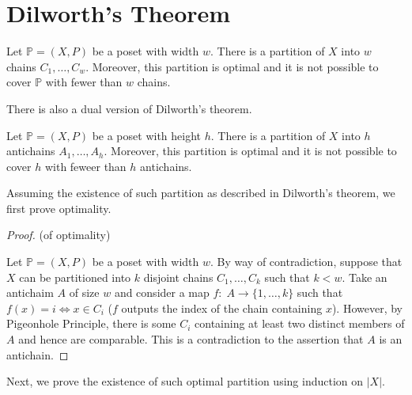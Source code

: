 \section{Dilworth's Theorem}

\begin{theorem}
    Let $\mathbb{P} = (X,P)$ be a poset with width $w$. There is a partition of $X$ into $w$ chains $C_1,\ldots,C_w$. Moreover, this partition is optimal and it is not possible to cover $\mathbb{P}$ with fewer than $w$ chains.
\end{theorem}

There is also a dual version of Dilworth's theorem.

\begin{theorem}
    Let $\mathbb{P} = (X,P)$ be a poset with height $h$. There is a partition of $X$ into $h$ antichains $A_1,\ldots,A_h$. Moreover, this partition is optimal and it is not possible to cover $h$ with feweer than $h$ antichains.
\end{theorem}

Assuming the existence of such partition as described in Dilworth's theorem, we first prove optimality.

\begin{proof} (of optimality)
    \hfill

    Let $\mathbb{P} = (X,P)$ be a poset with width $w$. By way of contradiction, suppose that $X$ can be partitioned into $k$ disjoint chains $C_1,\ldots, C_k$ such that $k < w$. Take an antichaim $A$ of size $w$ and consider a map $f:\; A \to \{1,\ldots,k\}$ such that $f(x) = i \iff x \in C_i$ ($f$ outputs the index of the chain containing $x$). However, by Pigeonhole Principle, there is some $C_i$ containing at least two distinct members of $A$ and hence are comparable. This is a contradiction to the assertion that $A$ is an antichain.
\end{proof}

Next, we prove the existence of such optimal partition using induction on $|X|$.

